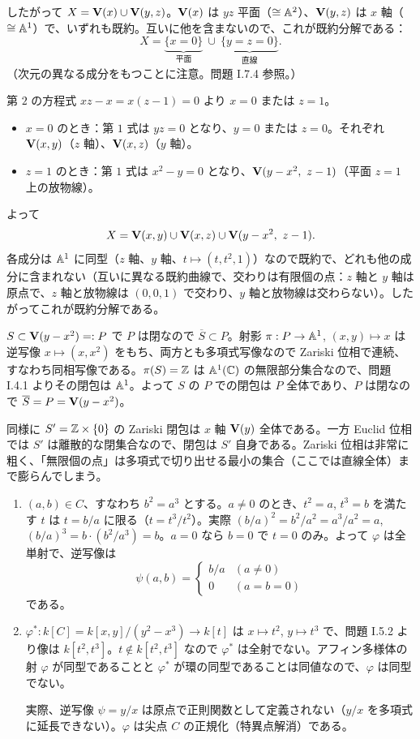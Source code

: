 したがって $X=\mathbf{V}(x)\cup\mathbf{V}(y,z)$。$\mathbf{V}(x)$ は $yz$ 平面（$\cong\mathbb{A}^2$）、$\mathbf{V}(y,z)$ は $x$ 軸（$\cong\mathbb{A}^1$）で、いずれも既約。互いに他を含まないので、これが既約分解である：
\[
  X=\underbrace{\{x=0\}}_{\text{平面}}\ \cup\ \underbrace{\{y=z=0\}}_{\text{直線}}.
\]
（次元の異なる成分をもつことに注意。問題 I.7.4 参照。）

第 $2$ の方程式 $xz-x=x(z-1)=0$ より $x=0$ または $z=1$。
\begin{itemize}
  \item $x=0$ のとき：第 $1$ 式は $yz=0$ となり、$y=0$ または $z=0$。それぞれ $\mathbf{V}(x,y)$（$z$ 軸）、$\mathbf{V}(x,z)$（$y$ 軸）。
  \item $z=1$ のとき：第 $1$ 式は $x^2-y=0$ となり、$\mathbf{V}(y-x^2,\ z-1)$（平面 $z=1$ 上の放物線）。
\end{itemize}
よって
\[
  X=\Zero(x,y)\cup\Zero(x,z)\cup\Zero(y-x^2,\ z-1).
\]
各成分は $\mathbb{A}^1$ に同型（$z$ 軸、$y$ 軸、$t\mapsto(t,t^2,1)$）なので既約で、どれも他の成分に含まれない（互いに異なる既約曲線で、交わりは有限個の点：$z$ 軸と $y$ 軸は原点で、$z$ 軸と放物線は $(0,0,1)$ で交わり、$y$ 軸と放物線は交わらない）。したがってこれが既約分解である。

$S\subset\mathbf{V}(y-x^2)=:P$ で $P$ は閉なので $\overline S\subset P$。射影 $\pi:P\to\mathbb{A}^1$, $(x,y)\mapsto x$ は逆写像 $x\mapsto(x,x^2)$ をもち、両方とも多項式写像なので Zariski 位相で連続、すなわち同相写像である。$\pi(S)=\mathbb{Z}$ は $\mathbb{A}^1(\mathbb{C})$ の無限部分集合なので、問題 I.4.1 よりその閉包は $\mathbb{A}^1$。よって $S$ の $P$ での閉包は $P$ 全体であり、$P$ は閉なので $\overline S=P=\mathbf{V}(y-x^2)$。

同様に $S'=\mathbb{Z}\times\{0\}$ の Zariski 閉包は $x$ 軸 $\mathbf{V}(y)$ 全体である。一方 Euclid 位相では $S'$ は離散的な閉集合なので、閉包は $S'$ 自身である。Zariski 位相は非常に粗く、「無限個の点」は多項式で切り出せる最小の集合（ここでは直線全体）まで膨らんでしまう。

\begin{enumerate}
  \item $(a,b)\in C$、すなわち $b^2=a^3$ とする。$a\neq0$ のとき、$t^2=a$, $t^3=b$ を満たす $t$ は $t=b/a$ に限る（$t=t^3/t^2$）。実際 $(b/a)^2=b^2/a^2=a^3/a^2=a$, $(b/a)^3=b\cdot(b^2/a^3)=b$。$a=0$ なら $b=0$ で $t=0$ のみ。よって $\varphi$ は全単射で、逆写像は
  \[
    \psi(a,b)=\begin{cases}b/a&(a\neq0)\\0&(a=b=0)\end{cases}
  \]
  である。
  \item $\varphi^*:k[C]=k[x,y]/(y^2-x^3)\to k[t]$ は $x\mapsto t^2$, $y\mapsto t^3$ で、問題 I.5.2 より像は $k[t^2,t^3]$。$t\notin k[t^2,t^3]$ なので $\varphi^*$ は全射でない。アフィン多様体の射 $\varphi$ が同型であることと $\varphi^*$ が環の同型であることは同値なので、$\varphi$ は同型でない。

  実際、逆写像 $\psi=y/x$ は原点で正則関数として定義されない（$y/x$ を多項式に延長できない）。$\varphi$ は尖点 $C$ の正規化（特異点解消）である。
\end{enumerate}


